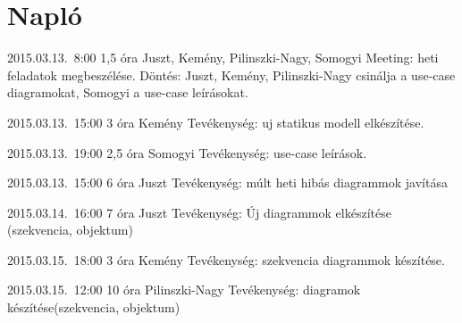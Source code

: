 %
\section{Napló}

\begin{naplo}

\bejegyzes
{2015.03.13.~8:00} %
{1,5 óra} %
{Juszt, Kemény, Pilinszki-Nagy, Somogyi} %
{Meeting: heti feladatok megbeszélése. Döntés: Juszt, Kemény, Pilinszki-Nagy csinálja a use-case diagramokat, Somogyi a use-case leírásokat.} %

\bejegyzes
{2015.03.13.~15:00} %
{3 óra} %
{Kemény} %
{Tevékenység: uj statikus modell elkészítése.} %

\bejegyzes
{2015.03.13.~19:00} %
{2,5 óra} %
{Somogyi} %
{Tevékenység: use-case leírások.} %

\bejegyzes
{2015.03.13.~15:00} %
{6 óra} %
{Juszt} %
{Tevékenység: múlt heti hibás diagrammok javítása} %

\bejegyzes
{2015.03.14.~16:00} %
{7 óra} %
{Juszt} %
{Tevékenység: Új diagrammok elkészítése (szekvencia, objektum)} %

\bejegyzes
{2015.03.15.~18:00} %
{3 óra} %
{Kemény} %
{Tevékenység: szekvencia diagrammok készítése.} %

\bejegyzes
{2015.03.15.~12:00} %
{10 óra} %
{Pilinszki-Nagy} %
{Tevékenység: diagramok készítése(szekvencia, objektum)} %

\end{naplo}

